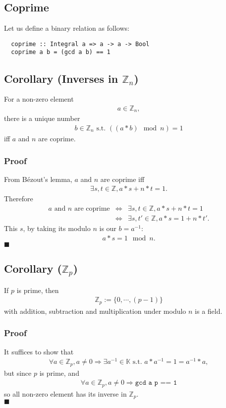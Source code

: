 \documentclass[11pt]{book}
\begin{document}
\subsection{Coprime}
Let us define a binary relation as follows:
\begin{verbatim}
  coprime :: Integral a => a -> a -> Bool
  coprime a b = (gcd a b) == 1
\end{verbatim}

\subsection{Corollary (Inverses in $\mathbb{Z}_n$)}
For a non-zero element
\begin{eqnarray}
a \in \mathbb{Z}_n,
\end{eqnarray}
there is a unique number 
\begin{eqnarray}
b \in \mathbb{Z}_n \text{ s.t. } ((a*b) \mod n) = 1
\end{eqnarray}
iff $a$ and $n$ are coprime.

\subsubsection{Proof}
From B\'ezout's lemma, $a$ and $n$ are coprime iff
\begin{eqnarray}
\exists s,t \in \mathbb{Z}, a*s + n*t = 1.
\end{eqnarray}
Therefore
\begin{eqnarray}
\text{$a$ and $n$ are coprime} &\Leftrightarrow& \exists s,t \in \mathbb{Z}, a*s + n*t = 1 \\
&\Leftrightarrow &\exists s,t' \in \mathbb{Z}, a*s = 1 + n*t'.
\end{eqnarray}
This $s$, by taking its modulo $n$ is our $b = a^{-1}$:
\begin{eqnarray}
a*s = 1 \mod n.
\end{eqnarray}
$\blacksquare$

\subsection{Corollary ($\mathbb{Z}_p$)}
If $p$ is prime, then 
\begin{eqnarray}
\mathbb{Z}_p := \{0, \cdots, (p-1)\}
\end{eqnarray}
with addition, subtraction and multiplication under modulo $n$ is a field.

\subsubsection{Proof}
It suffices to show that 
\begin{eqnarray}
\forall a \in \mathbb{Z}_p, a \neq 0 \Rightarrow \exists a^{-1} \in \mathbb{K} \text{ s.t. } a*a^{-1} = 1 = a^{-1}*a,
\end{eqnarray}
but since $p$ is prime, and
\begin{eqnarray}
\forall a \in \mathbb{Z}_p, a \neq 0 \Rightarrow \texttt{gcd a p == 1}
\end{eqnarray}
so all non-zero element has its inverse in $ \mathbb{Z}_p$.\\
$\blacksquare$
\end{document}
